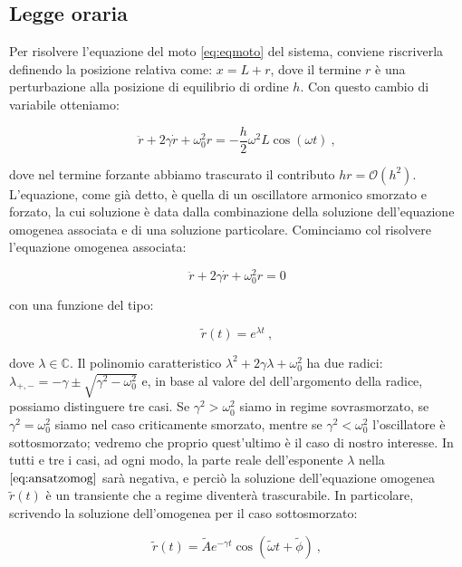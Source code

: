 \documentclass[a4paper,10pt]{article}
\begin{document}
\subsection{Legge oraria}

Per risolvere l'equazione del moto \eqref{eq:eqmoto} del sistema, conviene riscriverla definendo la posizione relativa come: $x = L + r$, dove il termine $r$ è una perturbazione alla posizione di equilibrio di ordine $h$.
Con questo cambio di variabile otteniamo:

\begin{equation} \label{eq:oscill}
    \ddot r + 2 \gamma \dot r + \omega_0^2 r = - \frac{h}{2} \omega^2 L \cos(\omega t) \ ,
\end{equation}

dove nel termine forzante abbiamo trascurato il contributo $h r = \mathcal O(h^2)$. L'equazione, come già detto, è quella di un oscillatore armonico smorzato e forzato, la cui soluzione è data dalla combinazione della soluzione dell'equazione omogenea associata e di una soluzione particolare.
Cominciamo col risolvere l'equazione omogenea associata:

\begin{equation} \label{eq:omog}
    \ddot r + 2 \gamma \dot r + \omega_0^2 r = 0
\end{equation}

con una funzione del tipo: 

\begin{equation} \label{eq:ansatzomog}
    \tilde r(t) = e^{\lambda t} \ ,
\end{equation}

dove $\lambda \in \mathbb C$.
Il polinomio caratteristico $\lambda^2 + 2\gamma \lambda + \omega_0^2$ ha due radici: $\lambda_{+,-} = -\gamma \pm \sqrt{\gamma^2 - \omega_0^2}$ e, in base al valore del dell'argomento della radice, possiamo distinguere tre casi.
Se $\gamma^2 > \omega_0^2$ siamo in regime sovrasmorzato, se $\gamma^2 = \omega_0^2$ siamo nel caso criticamente smorzato, mentre se $\gamma^2 < \omega_0^2$ l'oscillatore è sottosmorzato; vedremo che proprio quest'ultimo è il caso di nostro interesse.
In tutti e tre i casi, ad ogni modo, la parte reale dell'esponente $\lambda$ nella $\eqref{eq:ansatzomog}$ sarà negativa, e perciò la soluzione dell'equazione omogenea $\tilde r(t)$ è un transiente che a regime diventerà trascurabile.
In particolare, scrivendo la soluzione dell'omogenea per il caso sottosmorzato:

\begin{equation} \label{eq:sottosmorz}
    \tilde r(t) = \tilde A e^{-\gamma t} \cos(\tilde \omega t + \tilde \phi) \ ,
\end{equation}
\end{document}
